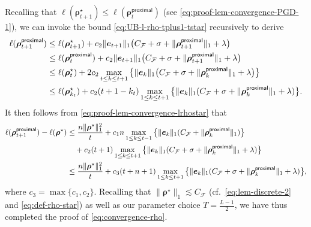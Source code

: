 \documentclass[english]{article}
\begin{document}
%
Recalling that $\ell({\bm \rho}_{t+1}^{\star}) \le \ell({\bm \rho}_t^{\mathsf{proximal}})$ (see \eqref{eq:proof-lem-convergence-PGD-1}), we can invoke the bound \eqref{eq:UB-l-rho-tplus1-tstar} recursively to derive
%
\begin{align}
\ell({\bm \rho}_{t+1}^{\mathsf{proximal}})
&\le 
\ell({\bm \rho}_{t+1}^{\star}) + c_2\|{\bm e}_{t+1}\|_1\big(C_{\mathcal{F}} + \sigma + \|{\bm \rho}_{t+1}^{\mathsf{proximal}}\|_1 + \lambda\big)\notag\\
 &\le \ell({\bm \rho}_t^{\mathsf{proximal}}) + c_2\|{\bm e}_{t+1}\|_1\big(C_{\mathcal{F}} + \sigma + \|{\bm \rho}_{t+1}^{\mathsf{proximal}}\|_1 + \lambda\big)\label{eq:proof-lem-convergence-temp-4}\\
 &\le \ell({\bm \rho}_t^{\star}) + 
2c_2\max_{t\le k\le t+1}\big\{\|{\bm e}_{k}\|_1\big(C_{\mathcal{F}} + \sigma + \|{\bm \rho}_{k}^{\mathsf{proximal}}\|_1 + \lambda\big)\big\}\notag\\
&\le \ell({\bm \rho}_{k_t}^{\star}) + 
c_2(t+1-k_t)\max_{1\le k\le t+1}\big\{\|{\bm e}_{k}\|_1(C_{\mathcal{F}} + \sigma + \|{\bm \rho}_{k}^{\mathsf{proximal}}\|_1 + \lambda)\big\}.
\end{align}
%
It then follows from \eqref{eq:proof-lem-convergence-lrhostar} that
%
\begin{align*}
\ell({\bm \rho}_{t+1}^{\mathsf{proximal}}) - \ell({\bm \rho}^{\star})
&\le \frac{n\|{\bm \rho}^{\star}\|_1^2}{t} + c_1n\max_{1\le k\le t-1} \big\{\|{\bm e}_k\|_1(C_{\mathcal{F}}+\|{\bm \rho}_k^{\mathsf{proximal}}\|_1) \big\} \notag\\
&\quad + 
c_2(t+1)\max_{1\le k\le t+1}\big\{\|{\bm e}_{k}\|_1(C_{\mathcal{F}} + \sigma + \|{\bm \rho}_{k}^{\mathsf{proximal}}\|_1 + \lambda)\big\}\notag\\
&\le \frac{n\|{\bm \rho}^{\star}\|_1^2}{t} + c_3(t+n+1)\max_{1\le k\le t+1}\big\{\|{\bm e}_{k}\|_1(C_{\mathcal{F}} + \sigma + \|{\bm \rho}_{k}^{\mathsf{proximal}}\|_1 + \lambda)\big\},\notag
\end{align*}
where $c_3 = \max\{c_1,c_2\}$.
Recalling that $\|{\bm \rho}^{\star}\|_1\lesssim C_{\mathcal{F}}$ (cf.~\eqref{eq:lem-discrete-2} and \eqref{eq:def-rho-star}) as well as our parameter choice $T=\frac{L-1}{2}$,  we have thus completed the proof of \eqref{eq:convergence-rho}. 
\end{document}
